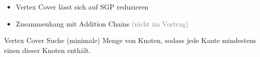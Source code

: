 \documentclass[xcolor=dvipsnames]{beamer}
\begin{document}
\begin{frame}{\FrameName}
\begin{itemize}[<+->]
	\item Vertex Cover lässt sich auf SGP reduzieren
	\item Zusammenhang mit Addition Chains \textcolor{gray}{(nicht im Vortrag)}
\end{itemize}
\end{frame}

\begin{frame}{\FrameName}
\begin{block}{Vertex Cover}
	\Gap
	Suche (minimale) Menge von Knoten, sodass jede Kante mindestens einen dieser Knoten enthält.\linebreak
	$ $\linebreak
	
\end{block}
\end{frame}
\end{document}
